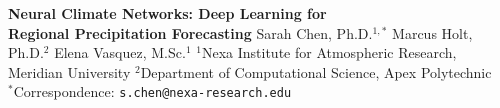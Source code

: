 \documentclass{article}
\begin{document}
\thispagestyle{empty}

\begin{headerbox}
  \begin{center}
    {\color{white}\Huge\bfseries Neural Climate Networks: Deep Learning for\\[3pt]
    Regional Precipitation Forecasting}
    \vspace{6mm}
    {\color{white}\Large Sarah Chen, Ph.D.${}^{1,*}$ \quad Marcus Holt, Ph.D.${}^{2}$ \quad Elena Vasquez, M.Sc.${}^{1}$}
    \vspace{4mm}
    {\color{white!85}\normalsize
    ${}^{1}$Nexa Institute for Atmospheric Research, Meridian University \hspace{1cm}
    ${}^{2}$Department of Computational Science, Apex Polytechnic\\[2pt]
    ${}^{*}$Correspondence: \texttt{s.chen@nexa-research.edu}}
  \end{center}
\end{headerbox}
\end{document}
